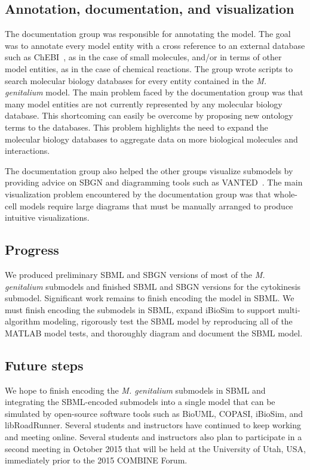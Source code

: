 \documentclass[journal,transmag]{IEEEtran}
\begin{document}
\subsection{Annotation, documentation, and visualization}
The documentation group was responsible for annotating the model.
The goal was to annotate every model entity with a cross reference to an external database such as ChEBI~\cite{Hastings2013}, as in the case of small molecules, and/or in terms of other model entities, as in the case of chemical reactions.
The group wrote scripts to search molecular biology databases for every entity contained in the \textit{M. genitalium} model.
The main problem faced by the documentation group was that many model entities are not currently represented by any molecular biology database.
This shortcoming can easily be overcome by proposing new ontology terms to the databases.
This problem highlights the need to expand the molecular biology databases to aggregate data on more biological molecules and interactions. 

The documentation group also helped the other groups visualize submodels by providing advice on SBGN and diagramming tools such as VANTED~\cite{Rohn2012}.
The main visualization problem encountered by the documentation group was that whole-cell models require large diagrams that must be manually arranged to produce intuitive visualizations.

\subsection{Progress}
We produced preliminary SBML and SBGN versions of most of the \textit{M. genitalium} submodels and finished SBML and SBGN versions for the cytokinesis submodel. Significant work remains to finish encoding the model in SBML. We must finish encoding the  submodels in SBML, expand iBioSim to support multi-algorithm modeling, rigorously test the SBML model by reproducing all of the MATLAB model tests, and thoroughly diagram and document the SBML model.

\subsection{Future steps}
We hope to finish encoding the \textit{M. genitalium} submodels in SBML and integrating the SBML-encoded submodels into a single model that can be simulated by open-source software tools such as BioUML, COPASI, iBioSim, and libRoadRunner. Several students and instructors have continued to keep working and meeting online. Several students and instructors also plan to participate in a second meeting in October 2015 that will be held at the University of Utah, USA, immediately prior to the 2015 COMBINE Forum.
\end{document}
